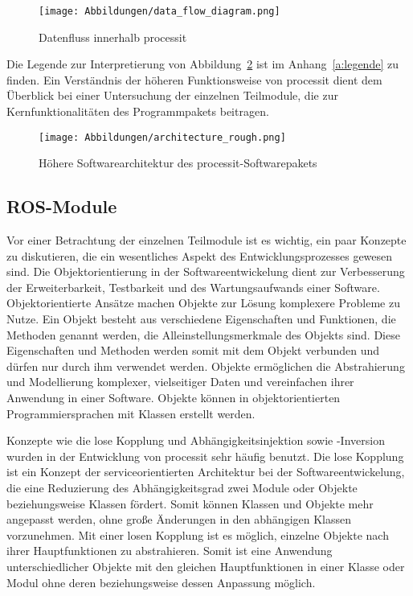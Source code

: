 \begin{figure}[htp]
	\texttt{[image: Abbildungen/data\_flow\_diagram.png]}
	\centering
	\caption{Datenfluss innerhalb processit}
	\label{fig:Datenfluss}
\end{figure}

Die Legende zur Interpretierung von Abbildung~\ref{fig:high-level-architecture} ist im Anhang~\ref{a:legende} zu finden. Ein Verständnis der höheren Funktionsweise von processit dient dem Überblick bei einer Untersuchung der einzelnen Teilmodule, die zur Kernfunktionalitäten des Programmpakets beitragen. 

\begin{figure}[tp]
	\texttt{[image: Abbildungen/architecture\_rough.png]}
	\centering
	\caption{Höhere Softwarearchitektur des processit-Softwarepakets}
	\label{fig:high-level-architecture}
\end{figure}

\subsection{ROS-Module}
Vor einer Betrachtung der einzelnen Teilmodule ist es wichtig, ein paar Konzepte zu diskutieren, die ein wesentliches Aspekt des Entwicklungsprozesses gewesen sind. Die Objektorientierung in der Softwareentwickelung dient zur Verbesserung der Erweiterbarkeit, Testbarkeit und des Wartungsaufwands einer Software. Objektorientierte Ansätze machen Objekte zur Lösung komplexere Probleme zu Nutze. Ein Objekt besteht aus verschiedene Eigenschaften und Funktionen, die Methoden genannt werden, die Alleinstellungsmerkmale des Objekts sind. Diese Eigenschaften und Methoden werden somit mit dem Objekt verbunden und dürfen nur durch ihm verwendet werden. Objekte ermöglichen die Abstrahierung und Modellierung komplexer, vielseitiger Daten und vereinfachen ihrer Anwendung in einer Software. Objekte können in objektorientierten Programmiersprachen mit Klassen erstellt werden. \autocite[27-28]{Lahres2021} \autocite[415-416]{Kaiser2022}

Konzepte wie die lose Kopplung und Abhängigkeitsinjektion sowie -Inversion wurden in der Entwicklung von processit sehr häufig benutzt. Die lose Kopplung ist ein Konzept der serviceorientierten Architektur bei der Softwareentwickelung, die eine Reduzierung des Abhängigkeitsgrad zwei Module oder Objekte beziehungsweise Klassen fördert. Somit können Klassen und Objekte mehr angepasst werden, ohne große Änderungen in den abhängigen Klassen vorzunehmen. Mit einer losen Kopplung ist es möglich, einzelne Objekte nach ihrer Hauptfunktionen zu abstrahieren. Somit ist eine Anwendung unterschiedlicher Objekte mit den gleichen Hauptfunktionen in einer Klasse oder Modul ohne deren beziehungsweise dessen Anpassung möglich. \autocite{Hockkoon2010}

